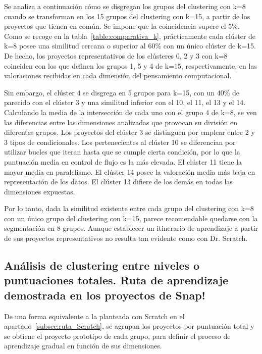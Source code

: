 \documentclass[a4paper, 12pt]{book}
\begin{document}
Se analiza a continuación cómo se disgregan los grupos del clustering con k=8 cuando se transforman en los 15 grupos del clustering con k=15, a partir de los proyectos que tienen en común. Se impone que la coincidencia supere el 5\%. Como se recoge en la tabla~\ref{table:comparativa_k}, prácticamente cada clúster de k=8 posee una similitud cercana o superior al 60\% con un único clúster de k=15. De hecho, los proyectos representativos de los clústeres 0, 2 y 3 con k=8 coinciden con los que definen los grupos 1, 5 y 4 de k=15, respectivamente, en las valoraciones recibidas en cada dimensión del pensamiento computacional. 

Sin embargo, el clúster 4 se disgrega en 5 grupos para k=15, con un 40\% de parecido con el clúster 3 y una similitud inferior con el 10, el 11, el 13 y el 14. Calculando la media de la intersección de cada uno con el grupo 4 de k=8, se ven las diferencias entre las dimensiones analizadas que provocan su división en diferentes grupos. Los proyectos del clúster 3 se distinguen por emplear entre 2 y 3 tipos de condicionales. Los pertenecientes al clúster 10 se diferencian por utilizar bucles que iteran hasta que se cumple cierta condición, por lo que la puntuación media en control de flujo es la más elevada. El clúster 11 tiene la mayor media en paralelismo. El clúster 14 posee la valoración media más baja en representación de los datos. El clúster 13 difiere de los demás en todas las dimensiones expuestas.

Por lo tanto, dada la similitud existente entre cada grupo del clustering con k=8 con un único grupo del clustering con k=15,  parece recomendable quedarse con la segmentación en 8 grupos. Aunque establecer un itinerario de aprendizaje a partir de sus proyectos representativos no resulta tan evidente como con Dr. Scratch.

\subsection{Análisis de clustering entre niveles o puntuaciones totales. Ruta de aprendizaje demostrada en los proyectos de Snap!}
\label{subsec:ruta_Snap}

De una forma equivalente a la planteada con Scratch en el apartado~\ref{subsec:ruta_Scratch}, se agrupan los proyectos por puntuación total y se obtiene el proyecto prototipo de cada grupo, para definir el proceso de aprendizaje gradual en función de sus dimensiones. 
\end{document}
